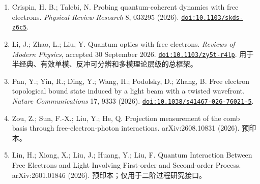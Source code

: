 {\begin{enumerate}
\item {}\label{ch07-ref9}Crispin, H. B.; Talebi, N. Probing quantum-coherent dynamics with free electrons. \emph{Physical Review Research} 8, 033295 (2026). \href{https://doi.org/10.1103/skds-z6c5}{\nolinkurl{doi:10.1103/skds-z6c5}}.
\item Li, J.; Zhao, L.; Liu, Y. Quantum optics with free electrons. \emph{Reviews of Modern Physics}, accepted 30 September 2026. \href{https://doi.org/10.1103/zy5t-r4lp}{\nolinkurl{doi:10.1103/zy5t-r4lp}}. 用于半经典、有效单模、反冲可分辨和多模理论层级的总框架。
\item Pan, Y.; Yin, R.; Ding, Y.; Wang, H.; Podolsky, D.; Zhang, B. Free electron topological bound state induced by a light beam with a twisted wavefront. \emph{Nature Communications} 17, 9333 (2026). \href{https://doi.org/10.1038/s41467-026-76021-5}{\nolinkurl{doi:10.1038/s41467-026-76021-5}}.
\item Zou, Z.; Sun, F.-X.; Liu, Y.; He, Q. Projection measurement of the comb basis through free-electron-photon interactions. arXiv:2608.10831 (2026). 预印本。
\item Lin, H.; Xiong, X.; Liu, J.; Huang, Y.; Liu, F. Quantum Interaction Between Free Electrons and Light Involving First-order and Second-order Process. arXiv:2601.01846 (2026). 预印本；仅用于二阶过程研究接口。
\end{enumerate}
}
